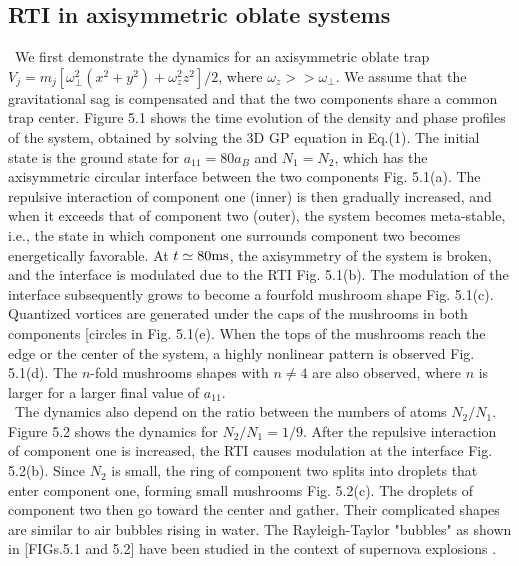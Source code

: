 \documentclass[12pt,a4paper]{report}
\begin{document}
\subsection{RTI in axisymmetric oblate systems}
\ We first demonstrate the dynamics for an axisymmetric
oblate trap $\displaystyle V_j = m_j [\omega_\perp^2 (x^2+y^2)+\omega_z^2 z^2]/2$, where $\omega_z >> \omega_\perp$.
We assume that the gravitational sag is compensated and
that the two components share a common trap center. Figure 5.1
shows the time evolution of the density and phase profiles of
the system, obtained by solving the 3D GP equation in Eq.(1).
The initial state is the ground state for $a_{11} = 80 a_B$ and
$N_1 = N_2$, which has the axisymmetric circular interface between
the two components Fig. 5.1(a). The repulsive interaction
of component one (inner) is then gradually increased, and
when it exceeds that of component two (outer), the system
becomes meta-stable, i.e., the state in which component one
surrounds component two becomes energetically favorable.
At $t \simeq 80 {\rm ms}$, the axisymmetry of the system is broken, and
the interface is modulated due to the RTI Fig. 5.1(b). The
modulation of the interface subsequently grows to become a
fourfold mushroom shape Fig. 5.1(c). Quantized vortices are
generated under the caps of the mushrooms in both components
[circles in Fig. 5.1(e). When the tops of the mushrooms
reach the edge or the center of the system, a highly nonlinear
pattern is observed Fig. 5.1(d). The $n$-fold mushrooms shapes
with $n \neq 4$ are also observed, where $n$ is larger for a larger final
value of $a_{11}$.
\\
\ The dynamics also depend on the ratio between the
numbers of atoms $N_2 / N_1$. Figure 5.2 shows the dynamics for 
$N_2/N_1 = 1/9$. After the repulsive interaction of component
one is increased, the RTI causes modulation at the interface
Fig. 5.2(b). Since $N_2$ is small, the ring of component two
splits into droplets that enter component one, forming small
mushrooms Fig. 5.2(c). The droplets of component two then
go toward the center and gather. Their complicated shapes
are similar to air bubbles rising in water. The Rayleigh-Taylor
"bubbles" as shown in [FIGs.5.1 and 5.2] have been studied in the
context of supernova explosions \cite{67}.
\end{document}
